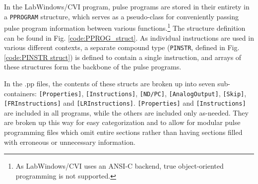 \documentclass[PaulGanssle-Thesis.tex]{subfiles}
\begin{document}
In the LabWindows/CVI program, pulse programs are stored in their entirety in a \texttt{PPROGRAM} structure, which serves as a pseudo-class for conveniently passing pulse program information between various functions.\footnote{As LabWindows/CVI uses an ANSI-C backend, true object-oriented programming is not supported.} The structure definition can be found in Fig. \ref{code:PPROG_struct}. As individual instructions are used in various different contexts, a separate compound type (\texttt{PINSTR}, defined in Fig. \ref{code:PINSTR struct}) is defined to contain a single instruction, and arrays of these structures form the backbone of the pulse programs.

In the .pp files, the contents of these structs are broken up into seven sub-containers: \texttt{[Properties]}, \texttt{[Instructions]}, \texttt{[ND/PC]}, \texttt{[AnalogOutput]}, \texttt{[Skip]}, \texttt{[FRInstructions]} and \texttt{[LRInstructions]}. \texttt{[Properties]} and \texttt{[Instructions]} are included in all programs, while the others are included only as-needed. They are broken up this way for easy categorization and to allow for modular pulse programming files which omit entire sections rather than having sections filled with erroneous or unnecessary information.
\end{document}
